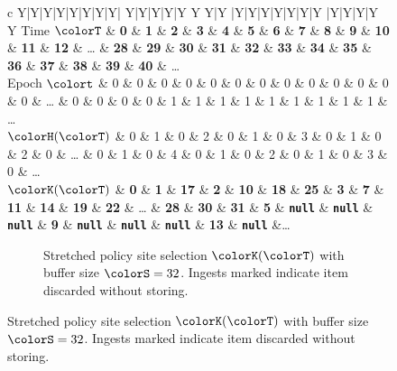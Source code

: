 \begin{figure}[htbp!]
  \centering

\begin{minipage}{\textwidth}
  \scriptsize
  \setlength{\tabcolsep}{2.5pt}
  \begin{tabularx}{\textwidth}{
    c
    Y|Y|Y|Y|Y|Y|Y|Y|
    Y|Y|Y|Y|Y Y Y|Y
    |Y|Y|Y|Y|Y|Y|Y
    |Y|Y|Y|Y Y
    }
     { Time $\colorT$} & \textbf{0} & \textbf{1} & \textbf{2} & \textbf{3} & \textbf{4} & \textbf{5} & \textbf{6} & \textbf{7}
    & \textbf{8} & \textbf{9} & \textbf{10} & \textbf{11} & \textbf{12} %
    &  \ldots
    & \textbf{28} & \textbf{29} & \textbf{30} & \textbf{31}
    & \textbf{32} & \textbf{33} & \textbf{34} & \textbf{35}
    & \textbf{36} & \textbf{37} & \textbf{38} & \textbf{39} & \textbf{40}
    & \ldots \\
   { Epoch $\colort$} & 0 & 0 & 0 & 0 & 0 & 0 & 0 & 0
    & 0 & 0 & 0 & 0 & 0 %
    &  \ldots
    & 0 & 0 & 0 & 0
    & 1 & 1 & 1 & 1
    & 1 & 1 & 1 & 1 & 1
    & \ldots \\
    { \scriptsize$\colorH(\colorT)$} & 0 & 1 & 0 & 2 & 0 & 1 & 0 & 3
    & 0 & 1 & 0 & 2 & 0 %
    &  \ldots
    & 0 & 1 & 0 & 4
    & 0 & 1 & 0 & 2
    & 0 & 1 & 0 & 3 & 0
    & \ldots \\
     { \scriptsize $\colorK(\colorT)$} & \textbf{0} & \textbf{1} & \textbf{17} & \textbf{2} & \textbf{10} & \textbf{18} & \textbf{25} & \textbf{3}
     & \textbf{7} & \textbf{11} & \textbf{14} & \textbf{19} & \textbf{22} & \ldots
 & \textbf{28} & \textbf{30} & \textbf{31} & \textbf{5} & {\tiny \texttt{\textbf{null\hphantom{}}}}  %
 & {\tiny \texttt{\textbf{null\hphantom{}}}} & {\tiny \texttt{\textbf{null\hphantom{}}}}  & \textbf{9} & {\tiny \texttt{\textbf{null\hphantom{}}}}
 & {\tiny \texttt{\textbf{null\hphantom{}}}} & {\tiny \texttt{\textbf{null\hphantom{}}}} & \textbf{13} & {\tiny \texttt{\textbf{null\hphantom{}}}}  &\ldots
  \end{tabularx}
\end{minipage}
\begin{subfigure}{\textwidth}
\vspace{-1ex}
\caption{\footnotesize Stretched policy site selection $\colorK(\colorT)$ with buffer size $\colorS=32$. Ingests marked \nullval{} indicate item discarded without storing.}
\label{fig:hsurf-stretched-implementation-site-selection}
\end{subfigure}


\end{figure}
